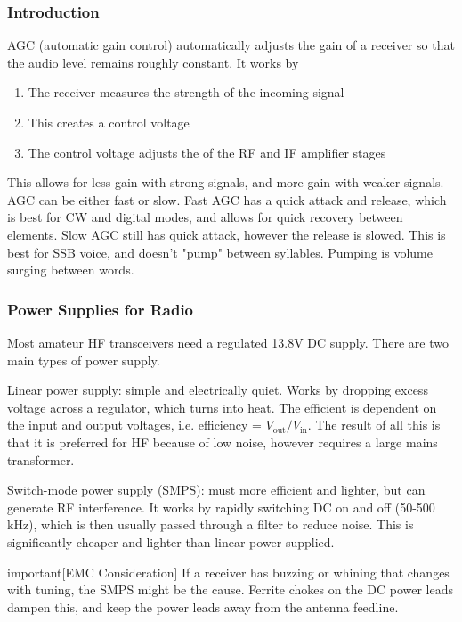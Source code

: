 \documentclass{article}
\begin{document}
\subsubsection{Introduction}
AGC (automatic gain control) automatically adjusts the gain of a receiver so that the audio level remains roughly constant. It works by
\begin{enumerate}
    \item The receiver measures the strength of the incoming signal
    \item This creates a control voltage
    \item The control voltage adjusts the of the RF and IF amplifier stages
\end{enumerate}
This allows for less gain with strong signals, and more gain with weaker signals. AGC can be either fast or slow. Fast AGC has a quick attack and release, which is best for CW and digital modes, and allows for quick recovery between elements. Slow AGC still has quick attack, however the release is slowed. This is best for SSB voice, and doesn't "pump" between syllables. Pumping is volume surging between words.
\subsubsection{Power Supplies for Radio}
Most amateur HF transceivers need a regulated 13.8V DC supply. There are two main types of power supply.

Linear power supply: simple and electrically quiet. Works by dropping excess voltage across a regulator, which turns into heat. The efficient is dependent on the input and output voltages, i.e. efficiency = $V_{\text{out}}/V_{\text{in}}$. The result of all this is that it is preferred for HF because of low noise, however requires a large mains transformer.

Switch-mode power supply (SMPS): must more efficient and lighter, but can generate RF interference. It works by rapidly switching DC on and off (50-500 kHz), which is then usually passed through a filter to reduce noise. This is significantly cheaper and lighter than linear power supplied.

\begin{callout}{important}[EMC Consideration]
    If a receiver has buzzing or whining that changes with tuning, the SMPS might be the cause. Ferrite chokes on the DC power leads dampen this, and keep the power leads away from the antenna feedline.
\end{callout}
\end{document}
